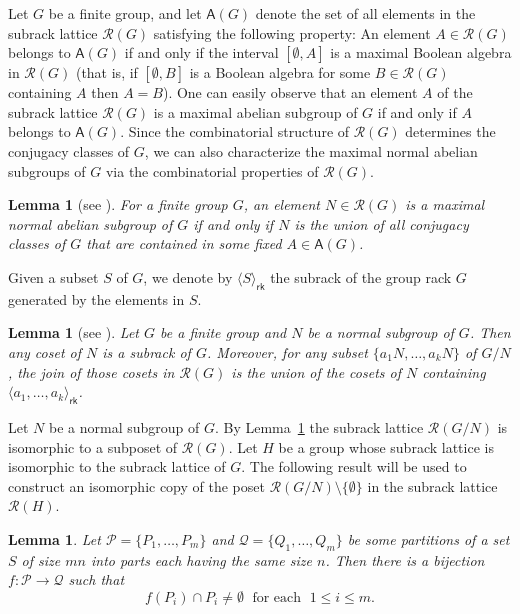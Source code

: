 \documentclass[a4paper,12pt]{article}
\newtheorem{lem}[thm]{Lemma}
\theoremstyle{definition}
\theoremstyle{remark}
\begin{document}
Let $G$ be a finite group, and let $\mathsf{A}(G)$ denote the set of all elements in the subrack lattice $\mathcal{R}(G)$ satisfying the following property: An element $A\in \mathcal{R}(G)$ belongs to $\mathsf{A}(G)$ if and only if the interval $[\emptyset,A]$ is a maximal Boolean algebra in $\mathcal{R}(G)$ (that is, if $[\emptyset,B]$ is a Boolean algebra for some $B\in \mathcal{R}(G)$ containing $A$ then $A=B$). One can easily observe that an element $A$ of the subrack lattice $\mathcal{R}(G)$ is a maximal abelian subgroup of $G$ if and only if $A$ belongs to $\mathsf{A}(G)$. Since the combinatorial structure of $\mathcal{R}(G)$ determines the conjugacy classes of $G$, we can also characterize the maximal normal abelian subgroups of $G$ via the combinatorial properties of $\mathcal{R}(G)$.

\begin{lem}[see {\cite[Lemma~3.1]{Kay21}}]\label{lem:normal}
  For a finite group $G$, an element $N\in\mathcal{R}(G)$ is a maximal normal abelian subgroup of $G$ if and only if $N$ is the union of all conjugacy classes of $G$ that are contained in some fixed $A\in \mathsf{A}(G)$.
\end{lem}

Given a subset $S$ of $G$, we denote by $\langle S\rangle_{\mathsf{rk}}$ the subrack of the group rack $G$ generated by the elements in $S$.

\begin{lem}[see {\cite[Lemma~3.2]{Kay21}}]\label{lem:coset}
  Let $G$ be a finite group and $N$ be a normal subgroup of $G$. Then any coset of $N$ is a subrack of $G$. Moreover, for any subset  $\{a_1N,\dots,a_kN\}$ of $G/N$, the join of those cosets in $\mathcal{R}(G)$ is the union of the cosets of $N$ containing $\langle a_1,\dots,a_k \rangle_{\mathsf{rk}}$.
\end{lem}

Let $N$ be a normal subgroup of $G$. By Lemma~\ref{lem:coset} the subrack lattice $\mathcal{R}(G/N)$ is isomorphic to a subposet of $\mathcal{R}(G)$. Let $H$ be a group whose subrack lattice is isomorphic to the subrack lattice of $G$. The following result will be used to construct an isomorphic copy of the poset $\mathcal{R}(G/N)\setminus \{\emptyset\}$ in the subrack lattice $\mathcal{R}(H)$.

\begin{lem}\label{lem:partition}
Let $\mathcal{P} = \{P_1,\dots,P_m\}$ and $\mathcal{Q} = \{Q_1,\dots,Q_m\}$ be some partitions of a set $S$ of size $mn$ into parts each having the same size $n$. Then there is a bijection $f\colon \mathcal{P}\to \mathcal{Q}$ such that $$ f(P_i)\cap P_i \neq \emptyset\; \text{ for each }\; 1\leq i\leq m. $$
\end{lem}
\end{document}
